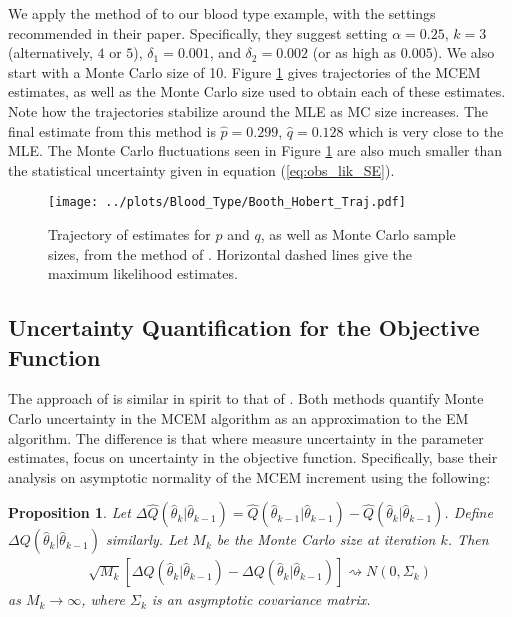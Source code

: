 \documentclass[ss]{imsart}
\theoremstyle{plain}
\newtheorem{proposition}{Proposition}[section]
\theoremstyle{definition}
\theoremstyle{remark}
\begin{document}
We apply the method of \citeauthor{Boo99} to our blood type example, with the settings recommended in their paper. Specifically, they suggest setting $\alpha = 0.25$, $k = 3$ (alternatively, $4$ or $5$), $\delta_1 = 0.001$, and $\delta_2 = 0.002$ (or as high as $0.005$). We also start with a Monte Carlo size of 10. Figure \ref{fig:blood_BH_traj} gives trajectories of the MCEM estimates, as well as the Monte Carlo size used to obtain each of these estimates. Note how the trajectories stabilize around the MLE as MC size increases. The final estimate from this method is $\hat{p} = 0.299$, $\hat{q} = 0.128$ which is very close to the MLE. The Monte Carlo fluctuations seen in Figure \ref{fig:blood_BH_traj} are also much smaller than the statistical uncertainty given in equation (\ref{eq:obs_lik_SE}).



\begin{figure}
    \centering
    \caption{Trajectory of estimates for $p$ and $q$, as well as Monte Carlo sample sizes, from the method of \citeauthor{Boo99}. Horizontal dashed lines give the maximum likelihood estimates.}
    \label{fig:blood_BH_traj}
    \texttt{[image: ../plots/Blood\_Type/Booth\_Hobert\_Traj.pdf]}   
\end{figure}









\subsection{Uncertainty Quantification for the Objective Function \citep{Caf05}}
\label{sec:AMCEM}

The approach of \citet{Caf05} is similar in spirit to that of \citet{Boo99}. Both methods quantify Monte Carlo uncertainty in the MCEM algorithm as an approximation to the EM algorithm. The difference is that where \citeauthor{Boo99} measure uncertainty in the parameter estimates, \citeauthor{Caf05} focus on uncertainty in the objective function. Specifically, \citeauthor{Caf05} base their analysis on asymptotic normality of the MCEM increment using the following:
%
\begin{proposition}
    \label{thm2:Caf_normality}
    Let $\Delta \hat{Q}(\hat{\theta}_k|\hat{\theta}_{k-1}) = \hat{Q}(\hat{\theta}_{k-1}|\hat{\theta}_{k-1}) - \hat{Q}(\hat{\theta}_k|\hat{\theta}_{k-1})$. Define $\Delta Q(\hat{\theta}_k|\hat{\theta}_{k-1})$ similarly. Let $M_k$ be the Monte Carlo size at iteration $k$. Then
    \begin{align}
        \sqrt{M_k} \left[ \Delta \hat{Q}(\hat{\theta}_k|\hat{\theta}_{k-1}) - \Delta Q(\hat{\theta}_k|\hat{\theta}_{k-1}) \right] \rightsquigarrow N(0, \Sigma_k)
    \end{align}
    as $M_k \rightarrow \infty$, where $\Sigma_k$ is an asymptotic covariance matrix.
\end{proposition}
\end{document}
